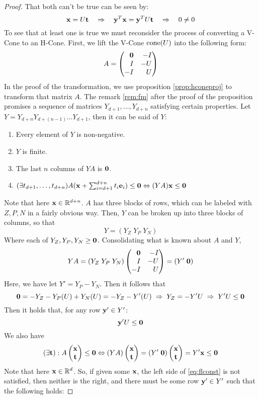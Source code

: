 \begin{proof}  That both can't be true can be seen by:
  \[ \mathbf{x} = U\mathbf{t} \quad\Rightarrow\quad \mathbf{y}^T\mathbf{x} = \mathbf{y}^T U\mathbf{t} \quad\Rightarrow\quad 0 \neq 0 \]
To see that at least one is true we must reconsider the process of converting a V-Cone to an H-Cone.  First, we lift the V-Cone $\operatorname{cone}(U)$ into the following form:
  \[ A = \begin{pmatrix*}[r] \0 & -I \\ I & -U \\ -I & U \end{pmatrix*}  \]
In the proof of the transformation, we use proposition \ref{prop:hconeproj} to transform that matrix $A$.  The remark \ref{rem:fm} after the proof of the proposition promises a sequence of matrices $Y_{d+1}, \dots, Y_{d+n}$ satisfying certain properties.  Let $Y = Y_{d+n}Y_{d+(n-1)}\dots Y_{d+1}$, then it can be said of $Y$:
\begin{enumerate}
  \item Every element of $Y$ is non-negative.
  \item $Y$ is finite.
  \item The last $n$ columns of $YA$ is $\mathbf{0}$.
  \item \((\exists t_{d+1},\dots,t_{d+n})A(\mathbf{x} + \sum_{i=d+1}^{d+n} t_i\mathbf{e}_i) \leq \mathbf{0} 
        \Leftrightarrow (YA)\mathbf{x} \leq \mathbf{0} \)
\end{enumerate}
Note that here $\mathbf{x} \in \mathbb{R}^{d+n}$.  $A$ has three blocks of rows, which can be labeled with $Z,P,N$ in a fairly obvious way.  Then, $Y$ can be broken up into three blocks of columns, so that
\[ Y = (Y_Z \; Y_P \; Y_N) \]
Where each of $Y_Z,Y_P,Y_N \geq \mathbf{0}$.  Consolidating what is known about $A$ and $Y$,
\[ YA = (Y_Z \; Y_P \; Y_N) \begin{pmatrix*}[r] \0 & -I \\ I & -U \\ -I & U \end{pmatrix*}  
      = (Y' \; \0) \]
Here, we have let $Y' = Y_P - Y_N$.  Then it follows that
\[ \mathbf{0} = -Y_Z - Y_P(U) + Y_N(U) = -Y_Z - Y'(U) \;\Rightarrow\; Y_Z = - Y'U 
          \;\Rightarrow\; Y'U \leq \mathbf{0} \]
Then it holds that, for any row $\mathbf{y}' \in Y'$:
\begin{equation}\label{eq:flneg}
  \mathbf{y}'U \leq \mathbf{0}
\end{equation}
We also have
\begin{equation}\label{eq:flconst}
  (\exists \t) : A \xt \leq \0 \Leftrightarrow (YA)\xt = (Y'\;\0)\xt = Y'\x \leq \0  
\end{equation}
Note that here $\mathbf{x} \in \mathbb{R}^d$.  So, if given some $\mathbf{x}$, the left side of \eqref{eq:flconst} is not satisfied, then neither is the right, and there must be some row $\mathbf{y}' \in Y'$ such that the following holds:

\end{proof}

